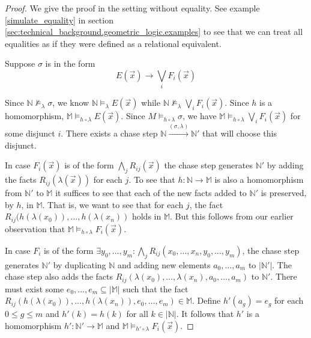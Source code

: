 		\begin{proof}

			We give the proof in the setting without equality. See example
			\ref{simulate_equality} in section
			\ref{sec:technical_background.geometric_logic.examples} to see that
			we can treat all equalities as if they were defined as a relational
			equivalent.

			Suppose $\sigma$ is in the form
				\[
				E(\vec{x}) \to \bigvee_i F_i(\vec{x})
				\]

			Since $\mathbb{N} \not\models_\lambda \sigma$, we know $\mathbb{N}
			\models_\lambda E(\vec{x})$ while $\mathbb{N} \not\models_\lambda
			\bigvee_i F_i(\vec{x})$. Since $h$ is a homomorphism, $\mathbb{M}
			\models_{h\circ\lambda} E(\vec{x})$. Since $M
			\models_{h\circ\lambda} \sigma$, we have $\mathbb{M}
			\models_{h\circ\lambda} \bigvee_i F_i(\vec{x})$ for some disjunct
			$i$. There exists a chase step $\mathbb{N}
			\xrightarrow{(\sigma,\lambda)} \mathbb{N}'$ that will choose this
			disjunct.

			In case $F_i(\vec x)$ is of the form $\bigwedge_j R_{ij}(\vec x)$
			the chase step generates $\mathbb{N}'$ by adding the facts
			$R_{ij}(\lambda(\vec{x}))$ for each $j$. To see that $h :
			\mathbb{N} \to \mathbb{M}$ is also a homomorphism from
			$\mathbb{N}'$ to $\mathbb{M}$ it suffices to see that each of the
			new facts added to $\mathbb{N}'$ is preserved, by $h$, in
			$\mathbb{M}$. That is, we want to see that for each $j$, the fact
			$R_{ij}(h(\lambda(x_0)),\ldots,h(\lambda(x_n))$ holds in
			$\mathbb{M}$. But this follows from our earlier observation that
			$\mathbb{M} \models_{h\circ\lambda} F_i(\vec x)$.

			In case $F_i$ is of the form $\exists y_0,\ldots,y_m : \bigwedge_j
			R_{ij}(x_0,\ldots,x_n,y_0,\ldots,y_m)$, the chase step generates
			$\mathbb{N}'$ by duplicating $\mathbb{N}$ and adding new elements
			$a_0,\ldots,a_m$ to $|\mathbb{N}'|$. The chase step also adds the
			facts $R_{ij}(\lambda(x_0),\ldots,\lambda(x_n),a_0,\ldots,a_m)$ to
			$\mathbb{N}'$. There must exist some $e_0,\ldots,e_m \subseteq
			|\mathbb{M}|$ such that the fact
			$R_{ij}(h(\lambda(x_0)),\ldots,h(\lambda(x_n)),e_0,\ldots,e_m) \in
			\mathbb{M}$. Define $h'(a_g) = e_g$ for each $0 \le g \le m$ and
			$h'(k) = h(k)$ for all $k \in |\mathbb{N}|$. It follows that $h'$
			is a homomorphism $h' : \mathbb{N}' \to \mathbb{M}$ and $\mathbb{M}
			\models_{h'\circ\lambda} F_i(\vec x)$.
		\end{proof}

